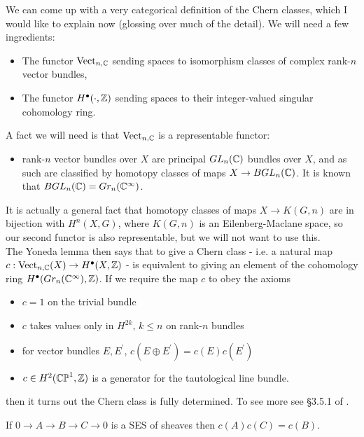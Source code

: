 \documentclass{article}
\begin{document}
\begin{remark}
	We can come up with a very categorical definition of the Chern classes, which I would like to explain now (glossing over much of the detail). We will need a few ingredients:
	\begin{itemize}
		\item The functor $\operatorname{Vect}_{n,\mathbb{C}}$ sending spaces to isomorphism classes of complex rank-$n$ vector bundles,
		\item The functor $H^\bullet(\cdot, \mathbb{Z})$ sending spaces to their integer-valued singular cohomology ring.
	\end{itemize}
	A fact we will need is that $\operatorname{Vect}_{n,\mathbb{C}}$ is a representable functor:
	\begin{itemize}
		\item rank-$n$ vector bundles over $X$ are principal $GL_n(\mathbb{C})$ bundles over $X$, and as such are classified by homotopy classes of maps $X \to BGL_n(\mathbb{C})$. It is known that $BGL_n(\mathbb{C}) = Gr_n(\mathbb{C}^\infty)$.
	\end{itemize}
	It is actually a  general fact that homotopy classes of maps $X\to K(G,n)$ are in bijection with $H^n(X,G)$, where $K(G,n)$ is an Eilenberg-Maclane space, so our second functor is also representable, but we will not want to use this. \\
	The Yoneda lemma then says that to give a Chern class - i.e. a natural map $c : \operatorname{Vect}_{n,\mathbb{C}}(X) \to H^\bullet(X,\mathbb{Z})$ - is equivalent to giving an element of the cohomology ring $H^\bullet(Gr_n(\mathbb{C}^\infty),\mathbb{Z})$. If we require the map $c$ to obey the axioms
	\begin{itemize}
		\item $c=1$ on the trivial bundle 
		\item $c$ takes values only in $H^{2k}, \, k \leq n$ on rank-$n$ bundles
		\item for vector bundles $E,E^\prime$, $c(E \oplus E^\prime) = c(E)c(E^\prime)$
		\item $c \in H^2(\mathbb{CP}^1,\mathbb{Z})$ is a generator for the tautological line bundle. 
	\end{itemize}
	then it turns out the Chern class is fully determined. To see more see \S3.5.1 of \cite{Hori2003}.
\end{remark}

\begin{prop}
	If $0 \to A \to B \to C \to 0$ is a SES of sheaves then $c(A)c(C)=c(B)$. 
\end{prop}
\end{document}
